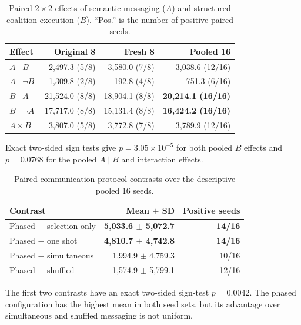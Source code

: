 \begin{table}[t]
  \caption{Paired $2\times2$ effects of semantic messaging ($A$) and structured
  coalition execution ($B$). ``Pos.'' is the number of positive paired seeds.}
  \label{tab:v51-factorial}
  \centering
  \scriptsize
  \begin{tabular}{lrrr}
    \toprule
    Effect & Original 8 & Fresh 8 & Pooled 16 \\
    \midrule
    $A\mid B$ & 2,497.3 (5/8) & 3,580.0 (7/8) & 3,038.6 (12/16) \\
    $A\mid \neg B$ & $-$1,309.8 (2/8) & $-$192.8 (4/8) & $-$751.3 (6/16) \\
    $B\mid A$ & 21,524.0 (8/8) & 18,904.1 (8/8) & \textbf{20,214.1 (16/16)} \\
    $B\mid \neg A$ & 17,717.0 (8/8) & 15,131.4 (8/8) & \textbf{16,424.2 (16/16)} \\
    $A\!\times\!B$ & 3,807.0 (5/8) & 3,772.8 (7/8) & 3,789.9 (12/16) \\
    \bottomrule
  \end{tabular}
  \vspace{1mm}
  \parbox{0.98\linewidth}{\scriptsize Exact two-sided sign tests give
  $p=3.05\times10^{-5}$ for both pooled $B$ effects and $p=0.0768$ for the
  pooled $A\mid B$ and interaction effects.}
\end{table}

\begin{table}[t]
  \caption{Paired communication-protocol contrasts over the descriptive pooled
  16 seeds.}
  \label{tab:v51-protocol-contrasts}
  \centering
  \scriptsize
  \begin{tabular}{lrr}
    \toprule
    Contrast & Mean $\pm$ SD & Positive seeds \\
    \midrule
    Phased $-$ selection only & \textbf{5,033.6 $\pm$ 5,072.7} & \textbf{14/16} \\
    Phased $-$ one shot & \textbf{4,810.7 $\pm$ 4,742.8} & \textbf{14/16} \\
    Phased $-$ simultaneous & 1,994.9 $\pm$ 4,759.3 & 10/16 \\
    Phased $-$ shuffled & 1,574.9 $\pm$ 5,799.1 & 12/16 \\
    \bottomrule
  \end{tabular}
  \vspace{1mm}
  \parbox{0.98\linewidth}{\scriptsize The first two contrasts have an exact
  two-sided sign-test $p=0.0042$. The phased configuration has the highest mean
  in both seed sets, but its advantage over simultaneous and shuffled messaging
  is not uniform.}
\end{table}

